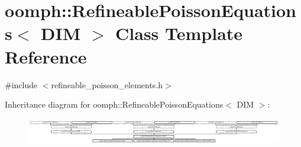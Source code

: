 \hypertarget{classoomph_1_1RefineablePoissonEquations}{}\section{oomph\+:\+:Refineable\+Poisson\+Equations$<$ D\+IM $>$ Class Template Reference}
\label{classoomph_1_1RefineablePoissonEquations}


{\ttfamily \#include $<$refineable\+\_\+poisson\+\_\+elements.\+h$>$}

Inheritance diagram for oomph\+:\+:Refineable\+Poisson\+Equations$<$ D\+IM $>$\+:\begin{figure}[H]
\begin{center}
\leavevmode
\includegraphics[height=1.190476cm]{classoomph_1_1RefineablePoissonEquations}
\end{center}
\end{figure}
